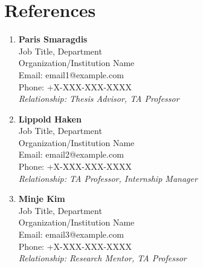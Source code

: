 \documentclass[a4paper,11pt]{article}
\begin{document}
\section{\textbf{References}}
\vspace{-0.2mm}
\small{
\begin{enumerate}[leftmargin=*,labelsep=2mm]
\item \textbf{Paris Smaragdis}\\
   Job Title, Department\\
   Organization/Institution Name\\
   Email: email1@example.com\\
   Phone: +X-XXX-XXX-XXXX\\
   \textit{Relationship: Thesis Advisor, TA Professor}

\item \textbf{Lippold Haken}\\
   Job Title, Department\\
   Organization/Institution Name\\
   Email: email2@example.com\\
   Phone: +X-XXX-XXX-XXXX\\
   \textit{Relationship: TA Professor, Internship Manager}

\item \textbf{Minje Kim}\\
   Job Title, Department\\
   Organization/Institution Name\\
   Email: email3@example.com\\
   Phone: +X-XXX-XXX-XXXX\\
   \textit{Relationship: Research Mentor, TA Professor}
\end{enumerate}
}
\end{document}
